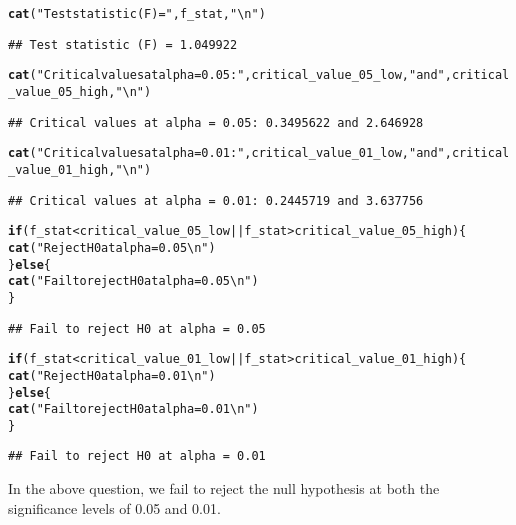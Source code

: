 \documentclass{article}\usepackage[]{graphicx}\usepackage[]{xcolor}
\makeatletter
\newcommand{\hlsng}[1]{\textcolor[rgb]{0.192,0.494,0.8}{#1}}%
\newcommand{\hlopt}[1]{\textcolor[rgb]{0,0,0}{#1}}%
\newcommand{\hldef}[1]{\textcolor[rgb]{0.345,0.345,0.345}{#1}}%
\newcommand{\hlkwa}[1]{\textcolor[rgb]{0.161,0.373,0.58}{\textbf{#1}}}%
\newcommand{\hlkwd}[1]{\textcolor[rgb]{0.737,0.353,0.396}{\textbf{#1}}}%
\newenvironment{kframe}{%
 \def\at@end@of@kframe{}%
 \ifinner\ifhmode%
  \def\at@end@of@kframe{\end{minipage}}%
  \begin{minipage}{\columnwidth}%
 \fi\fi%
 \def\FrameCommand##1{\hskip\@totalleftmargin \hskip-\fboxsep
 \colorbox{shadecolor}{##1}\hskip-\fboxsep
     \hskip-\linewidth \hskip-\@totalleftmargin \hskip\columnwidth}%
 \MakeFramed {\advance\hsize-\width
   \@totalleftmargin\z@ \linewidth\hsize
   \@setminipage}}%
 {\par\unskip\endMakeFramed%
 \at@end@of@kframe}
\newenvironment{knitrout}{}{} %
\makeatother
\begin{document}
\begin{knitrout}
\begin{kframe}
\begin{alltt}
\hlkwd{cat}\hldef{(}\hlsng{"Test statistic (F) ="}\hldef{, f_stat,} \hlsng{"\textbackslash{}n"}\hldef{)}
\end{alltt}
\begin{verbatim}
## Test statistic (F) = 1.049922
\end{verbatim}
\begin{alltt}
\hlkwd{cat}\hldef{(}\hlsng{"Critical values at alpha = 0.05:"}\hldef{, critical_value_05_low,} \hlsng{"and"}\hldef{, critical_value_05_high,} \hlsng{"\textbackslash{}n"}\hldef{)}
\end{alltt}
\begin{verbatim}
## Critical values at alpha = 0.05: 0.3495622 and 2.646928
\end{verbatim}
\begin{alltt}
\hlkwd{cat}\hldef{(}\hlsng{"Critical values at alpha = 0.01:"}\hldef{, critical_value_01_low,} \hlsng{"and"}\hldef{, critical_value_01_high,} \hlsng{"\textbackslash{}n"}\hldef{)}
\end{alltt}
\begin{verbatim}
## Critical values at alpha = 0.01: 0.2445719 and 3.637756
\end{verbatim}
\begin{alltt}
\hlkwa{if} \hldef{(f_stat} \hlopt{<} \hldef{critical_value_05_low} \hlopt{||} \hldef{f_stat} \hlopt{>} \hldef{critical_value_05_high) \{}
  \hlkwd{cat}\hldef{(}\hlsng{"Reject H0 at alpha = 0.05\textbackslash{}n"}\hldef{)}
\hldef{\}} \hlkwa{else} \hldef{\{}
  \hlkwd{cat}\hldef{(}\hlsng{"Fail to reject H0 at alpha = 0.05\textbackslash{}n"}\hldef{)}
\hldef{\}}
\end{alltt}
\begin{verbatim}
## Fail to reject H0 at alpha = 0.05
\end{verbatim}
\begin{alltt}
\hlkwa{if} \hldef{(f_stat} \hlopt{<} \hldef{critical_value_01_low} \hlopt{||} \hldef{f_stat} \hlopt{>} \hldef{critical_value_01_high) \{}
  \hlkwd{cat}\hldef{(}\hlsng{"Reject H0 at alpha = 0.01\textbackslash{}n"}\hldef{)}
\hldef{\}} \hlkwa{else} \hldef{\{}
  \hlkwd{cat}\hldef{(}\hlsng{"Fail to reject H0 at alpha = 0.01\textbackslash{}n"}\hldef{)}
\hldef{\}}
\end{alltt}
\begin{verbatim}
## Fail to reject H0 at alpha = 0.01
\end{verbatim}
\end{kframe}
\end{knitrout}
In the above question, we fail to reject the null hypothesis at both the significance levels of 0.05 and 0.01.
\end{document}
